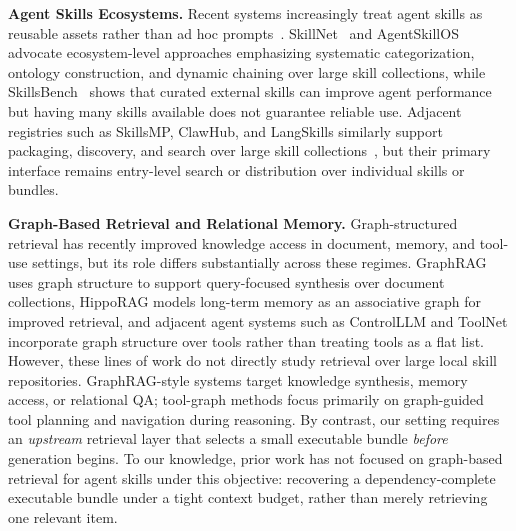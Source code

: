 \noindent\textbf{Agent Skills Ecosystems.} Recent systems increasingly treat agent skills as reusable assets rather than ad hoc prompts~\citep{agentskills2026, skillnet2026, li2026agentskillos}.
%
SkillNet~\citep{skillnet2026} and AgentSkillOS~\citep{li2026agentskillos} advocate ecosystem-level approaches emphasizing systematic categorization, ontology construction, and dynamic chaining over large skill collections, while SkillsBench~\citep{li2026skillsbench} shows that curated external skills can improve agent performance but having many skills available does not guarantee reliable use.
%
Adjacent registries such as SkillsMP, ClawHub, and LangSkills similarly support packaging, discovery, and search over large skill collections~\citep{skillsmp2026, clawhub2026, li2025self,langskills2026}, but their primary interface remains entry-level search or distribution over individual skills or bundles.


\noindent\textbf{Graph-Based Retrieval and Relational Memory.} 
Graph-structured retrieval has recently improved knowledge access in document, memory, and tool-use settings, but its role differs substantially across these regimes. GraphRAG \citep{edge2024graphrag} uses graph structure to support query-focused synthesis over document collections, HippoRAG \citep{gutierrez2024hipporag} models long-term memory as an associative graph for improved retrieval, and adjacent agent systems such as ControlLLM \citep{liu2023controlllm} and ToolNet \citep{liu2024toolnet} incorporate graph structure over tools rather than treating tools as a flat list.
%
However, these lines of work do not directly study retrieval over large local skill repositories. GraphRAG-style systems target knowledge synthesis, memory access, or relational QA; tool-graph methods focus primarily on graph-guided tool planning and navigation during reasoning. By contrast, our setting requires an \emph{upstream} retrieval layer that selects a small executable bundle \textit{before} generation begins. To our knowledge, prior work has not focused on graph-based retrieval for agent skills under this objective: recovering a dependency-complete executable bundle under a tight context budget, rather than merely retrieving one relevant item.

